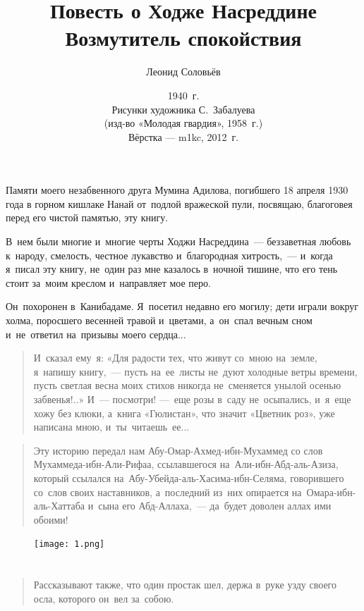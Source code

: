\documentclass[12pt,a4paper]{book}
\title{\textbf{Повесть о Ходже Насреддине} \\ Возмутитель спокойствия}
\author{Леонид Соловьёв}
\date{1940~г. \\ Рисунки художника С.~Забалуева \\ (изд-во «Молодая гвардия», 1958~г.) \\ Вёрстка --- m1kc, 2012~г.}
\begin{document}
\maketitle

Памяти моего незабвенного друга Мумина Адилова, погибшего 18 апреля 1930 года в горном кишлаке Нанай от~подлой вражеской пули, посвящаю, благоговея перед его чистой памятью, эту книгу.

В~нем были многие и~многие черты Ходжи Насреддина~— беззаветная любовь к~народу, смелость, честное лукавство и~благородная хитрость,~— и~когда я~писал эту книгу, не~один раз мне казалось в~ночной тишине, что его тень стоит за~моим креслом и~направляет мое перо.

Он~похоронен в~Канибадаме. Я~посетил недавно его могилу; дети играли вокруг холма, поросшего весенней травой и~цветами, а~он~спал вечным сном и~не~ответил на~призывы моего сердца...

\begin{quote}
И~сказал ему~я: «Для радости тех, что живут со~мною на~земле, я~напишу книгу,~— пусть на~ее~листы не~дуют холодные ветры времени, пусть светлая весна моих стихов никогда не~сменяется унылой осенью забвенья!..» И~— посмотри! —~еще розы в~саду не~осыпались, и~я~еще хожу без клюки, а~книга «Гюлистан», что значит «Цветник роз», уже написана мною, и~ты~читаешь~ее...
\end{quote}

\begin{quote}
Эту историю передал нам Абу-Омар-Ахмед-ибн-Мухаммед со слов Мухаммеда-ибн-Али-Рифаа, ссылавшегося на~Али-ибн-Абд-аль-Азиза, который ссылался на~Абу-Убейда-аль-Хасима-ибн-Селяма, говорившего со~слов своих наставников, а~последний из~них опирается на~Омара-ибн-аль-Хаттаба и~сына его Абд-Аллаха,~— да~будет доволен аллах ими обоими!
\end{quote}

\begin{figure}[p]
\centering
\texttt{[image: 1.png]}
\end{figure}

\part{}

\begin{quote}
Рассказывают также, что один простак шел, держа в~руке узду своего осла, которого он~вел за~собою.
\end{quote}
\end{document}
